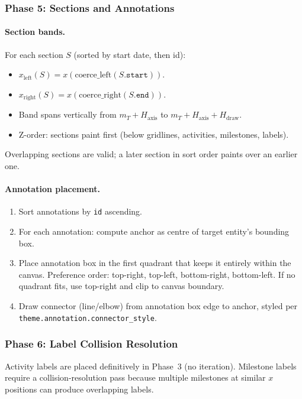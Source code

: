 \subsubsection{Phase 5: Sections and Annotations}
\label{sec:phase5}

\paragraph{Section bands.}
For each section $S$ (sorted by start date, then id):
\begin{itemize}
  \item $x_{\text{left}}(S) = x(\text{coerce\_left}(S.\texttt{start}))$.
  \item $x_{\text{right}}(S) = x(\text{coerce\_right}(S.\texttt{end}))$.
  \item Band spans vertically from $m_T + H_{\mathrm{axis}}$ to
        $m_T + H_{\mathrm{axis}} + H_{\mathrm{draw}}$.
  \item Z-order: sections paint first (below gridlines, activities, milestones, labels).
\end{itemize}
Overlapping sections are valid; a later section in sort order paints over an earlier one.

\paragraph{Annotation placement.}
\begin{enumerate}
  \item Sort annotations by \texttt{id} ascending.
  \item For each annotation: compute anchor as centre of target entity's bounding box.
  \item Place annotation box in the first quadrant that keeps it entirely within the canvas.
        Preference order: top-right, top-left, bottom-right, bottom-left.
        If no quadrant fits, use top-right and clip to canvas boundary.
  \item Draw connector (line/elbow) from annotation box edge to anchor,
        styled per \texttt{theme.annotation.connector\_style}.
\end{enumerate}

\subsubsection{Phase 6: Label Collision Resolution}
\label{sec:phase6}

Activity labels are placed definitively in Phase~3 (no iteration). Milestone labels require
a collision-resolution pass because multiple milestones at similar $x$ positions can produce
overlapping labels.

